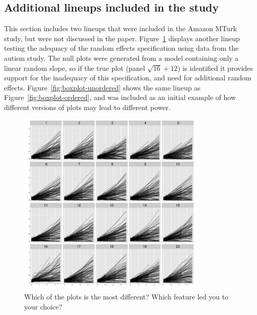 \documentclass[12pt]{article} %
\begin{document}
\subsection{Additional lineups included in the study}\label{app:morelineups}

This section includes two lineups that were included in the Amazon MTurk study, but were not discussed in the paper. Figure~\ref{fig:autism-ranef} displays another lineup testing the adequacy of the random effects specification using data from the autism study. The null plots were generated from a model containing only a linear random slope, so if the true plot (panel $\sqrt{16} + 12$) is identified it provides support for the inadequacy of this specification, and need for additional random effects. Figure~\ref{fig:boxplot-unordered} shows the same lineup as Figure~\ref{fig:boxplot-ordered}, and was included as an initial example of how different versions of plots may lead to different power.

\begin{figure}
	\centering
	\includegraphics[width=0.8\textwidth]{autism-fanned2-16.pdf}
	\caption{\label{fig:autism-ranef} Which of the plots is the most different? Which feature led you to your choice? }
\end{figure}
\end{document}
